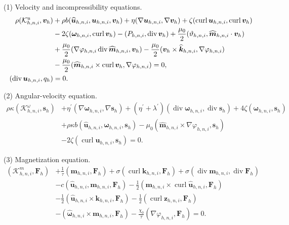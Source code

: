 \documentclass[11pt,a4paper]{article}
\newcommand{\bs}{\boldsymbol}
\DeclareMathOperator{\curl}{curl}
\DeclareMathOperator{\ddiv}{div}
\newcommand{\Div}{\ddiv}
\theoremstyle{definition}
\numberwithin{equation}{section}
\begin{document}
\noindent
(1) Velocity and incompressibility equations.
\begin{subequations}\label{eq:NS-sol}
\begin{align}
\rho(\mathcal K_{h,n,i}^u,\bs v_h)
&+
\rho b(\widehat{\bs u}_{h,n,i},\bs u_{h,n,i},\bs v_h)
+
\eta(\nabla\bs u_{h,n,i},\nabla\bs v_h)
+
\zeta(\curl\bs u_{h,n,i},\curl\bs v_h)
\notag\\
&-
2\zeta(\bs\omega_{h,n,i},\curl\bs v_h)
-
(P_{h,n,i},\Div\bs v_h)
+
\frac{\mu_0}{2}
(\vartheta_{h,n,i},
 \widehat{\bs m}_{h,n,i}\cdot\bs v_h)
\notag\\
&+
\frac{\mu_0}{2}
(\nabla\varphi_{h,n,i}\Div\widehat{\bs m}_{h,n,i},
 \bs v_h)
-
\frac{\mu_0}{2}
(\bs v_h\times\widehat{\bs k}_{h,n,i},
 \nabla\varphi_{h,n,i})
\notag\\
&-
\frac{\mu_0}{2}
(\widehat{\bs m}_{h,n,i}\times\curl\bs v_h,
 \nabla\varphi_{h,n,i})
=
0,
\\
(\Div\bs u_{h,n,i},q_h)
&=
0.
\end{align}
\end{subequations}

\noindent
(2) Angular-velocity equation.
\begin{equation}\label{eq:angular-sol}
\begin{aligned}
\rho\kappa(\mathcal K_{h,n,i}^\omega,\bs s_h)
&+
\eta^\prime(\nabla\bs\omega_{h,n,i},\nabla\bs s_h)
+
(\eta^\prime+\lambda^\prime)
(\Div\bs\omega_{h,n,i},\Div\bs s_h)
+
4\zeta(\bs\omega_{h,n,i},\bs s_h)
\\
&+
\rho\kappa
b(\widehat{\bs u}_{h,n,i},\bs\omega_{h,n,i},\bs s_h)
-
\mu_0
(\widehat{\bs m}_{h,n,i}\times\nabla\varphi_{h,n,i},
 \bs s_h)
\\
&-
2\zeta(\curl\bs u_{h,n,i},\bs s_h)
=
0.
\end{aligned}
\end{equation}

\noindent
(3) Magnetization equation.
\begin{equation}\label{eq:mag-sol}
\begin{aligned}
(\mathcal K_{h,n,i}^m,\bs F_h)
&+
\frac{1}{\tau}(\bs m_{h,n,i},\bs F_h)
+
\sigma(\curl\bs k_{h,n,i},\bs F_h)
+
\sigma(\Div\bs m_{h,n,i},\Div\bs F_h)
\\
&-
c(\widehat{\bs u}_{h,n,i},\bs m_{h,n,i},\bs F_h)
-
\frac12
(\bs m_{h,n,i}\times\curl\widehat{\bs u}_{h,n,i},
 \bs F_h)
\\
&-
\frac12
(\widehat{\bs u}_{h,n,i}\times\bs k_{h,n,i},
 \bs F_h)
-
\frac12
(\curl\bs z_{h,n,i},\bs F_h)
\\
&-
(\widehat{\bs\omega}_{h,n,i}\times\bs m_{h,n,i},
 \bs F_h)
-
\frac{\chi_0}{\tau}
(\nabla\varphi_{h,n,i},\bs F_h)
=
0.
\end{aligned}
\end{equation}
\end{document}
